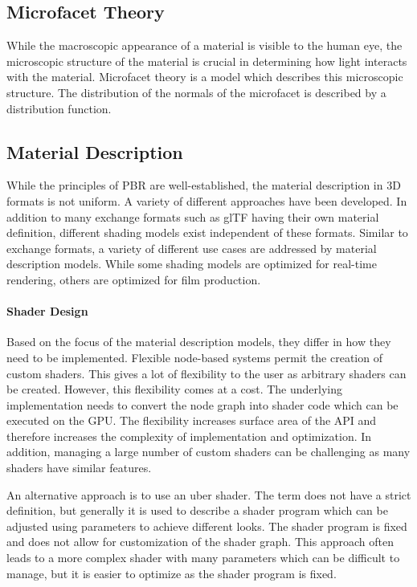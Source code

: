 \subsection{Microfacet Theory}

While the macroscopic appearance of a material is visible to the human eye, the microscopic structure of the material is crucial in determining how light interacts with the material. Microfacet theory is a model which describes this microscopic structure. The distribution of the normals of the microfacet is described by a distribution function.

\subsection{Material Description}

While the principles of \gls{PBR} are well-established, the material description in 3D formats is not uniform. A variety of different approaches have been developed. In addition to many exchange formats such as \gls{glTF} having their own material definition, different shading models exist independent of these formats. Similar to exchange formats, a variety of different use cases are addressed by material description models. While some shading models are optimized for real-time rendering, others are optimized for film production.

\paragraph{Shader Design}

Based on the focus of the material description models, they differ in how they need to be implemented. Flexible node-based systems permit the creation of custom shaders. This gives a lot of flexibility to the user as arbitrary shaders can be created. However, this flexibility comes at a cost. The underlying implementation needs to convert the node graph into shader code which can be executed on the \gls{GPU}. The flexibility increases surface area of the \gls{API} and therefore increases the complexity of implementation and optimization. In addition, managing a large number of custom shaders can be challenging as many shaders have similar features.

An alternative approach is to use an \gls{uber shader}. The term does not have a strict definition, but generally it is used to describe a shader program which can be adjusted using parameters to achieve different looks. The shader program is fixed and does not allow for customization of the shader graph. This approach often leads to a more complex shader with many parameters which can be difficult to manage, but it is easier to optimize as the shader program is fixed.

